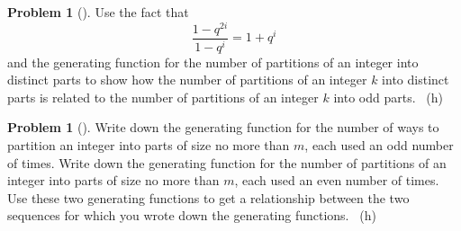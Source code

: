 \documentclass[10pt,]{book}
\theoremstyle{plain}
\theoremstyle{definition}
\newtheorem{activity}[project]{Problem}
\theoremstyle{definition}
\numberwithin{equation}{chapter}
\begin{document}
\begin{activity}[]\marginsymbol[-1em]{} \label{activity-208}
\hypertarget{p-1180}{}%
Use the fact that%
\begin{equation*}
\frac{1-q^{2i}}{1-q^i}= 1+q^i
\end{equation*}
and the generating function for the number of partitions of an integer into distinct parts to show how the number of partitions of an integer \(k\) into distinct parts is related to the number of partitions of an integer \(k\) into odd parts.%
~{\tiny (h)}\end{activity}
\begin{activity}[]\marginsymbol[-1em]{} \label{activity-209}
\hypertarget{p-1183}{}%
Write down the generating function for the number of ways to partition an integer into parts of size no more than \(m\), each used an odd number of times. Write down the generating function for the number of partitions of an integer into parts of size no more than \(m\), each used an even number of times. Use these two generating functions to get a relationship between the two sequences for which you wrote down the generating functions.%
~{\tiny (h)}\end{activity}
\end{document}
